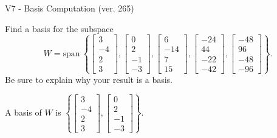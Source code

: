 \begin{exercise}
  \begin{exerciseTitle}V7 - Basis Computation (ver. 265)\end{exerciseTitle}
  \begin{exerciseStatement}
    Find a basis for the subspace 
\[W=\mathrm{span}\ \left\{\left[\begin{array}{r}
3 \\
-4 \\
2 \\
3
\end{array}\right] , \left[\begin{array}{r}
0 \\
2 \\
-1 \\
-3
\end{array}\right] , \left[\begin{array}{r}
6 \\
-14 \\
7 \\
15
\end{array}\right] , \left[\begin{array}{r}
-24 \\
44 \\
-22 \\
-42
\end{array}\right] , \left[\begin{array}{r}
-48 \\
96 \\
-48 \\
-96
\end{array}\right]\right\}.\]
 Be sure to explain why your result is a basis.


  \end{exerciseStatement}
  \begin{exerciseAnswer}
   A basis of \(W\) is  \(\left\{\left[\begin{array}{r}
3 \\
-4 \\
2 \\
3
\end{array}\right] , \left[\begin{array}{r}
0 \\
2 \\
-1 \\
-3
\end{array}\right]\right\}\).
  


  \end{exerciseAnswer}
\end{exercise}